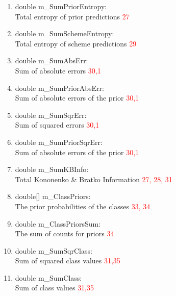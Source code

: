 \documentclass[a4paper,12pt]{article}
\begin{document}
\begin{enumerate}
  \item double m\_SumPriorEntropy: \\ Total entropy of prior predictions \textcolor{red}{27}
  
  \item double m\_SumSchemeEntropy: \\ Total entropy of scheme predictions \textcolor{red}{29}
  
  \item double m\_SumAbsErr: \\ Sum of absolute errors \textcolor{red}{30,1}
  
  \item double m\_SumPriorAbsErr: \\ Sum of absolute errors of the prior \textcolor{red}{30,1}
  
  
  \item double m\_SumSqrErr: \\ Sum of squared errors \textcolor{red}{30,1}

  \item double m\_SumPriorSqrErr: \\ Sum of absolute errors of the prior \textcolor{red}{30,1}
  
  \item double m\_SumKBInfo: \\ Total Kononenko \& Bratko Information \textcolor{red}{27, 28, 31}
  
  \item double[] m\_ClassPriors: \\ The prior probabilities of the classes \textcolor{red}{33, 34}

  \item double m\_ClassPriorsSum: \\ The sum of counts for priors  \textcolor{red}{34}
  
  \item double m\_SumSqrClass: \\ Sum of squared class values  \textcolor{red}{31,35}     
  
  \item double m\_SumClass: \\ Sum of class values \textcolor{red}{31,35} 
  

\end{enumerate}
\end{document}
